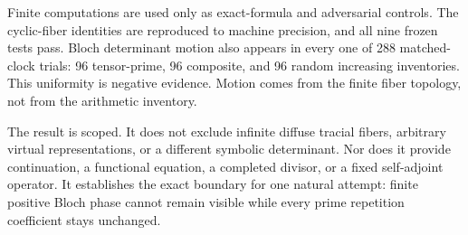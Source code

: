 Finite computations are used only as exact-formula and adversarial controls.
The cyclic-fiber identities are reproduced to machine precision, and all
nine frozen tests pass.  Bloch determinant motion also appears in every one
of 288 matched-clock trials: 96 tensor-prime, 96 composite, and 96 random
increasing inventories.  This uniformity is negative evidence.  Motion
comes from the finite fiber topology, not from the arithmetic inventory.

The result is scoped.  It does not exclude infinite diffuse tracial fibers,
arbitrary virtual representations, or a different symbolic determinant.
Nor does it provide continuation, a functional equation, a completed
divisor, or a fixed self-adjoint operator.  It establishes the exact boundary
for one natural attempt: finite positive Bloch phase cannot remain visible
while every prime repetition coefficient stays unchanged.
